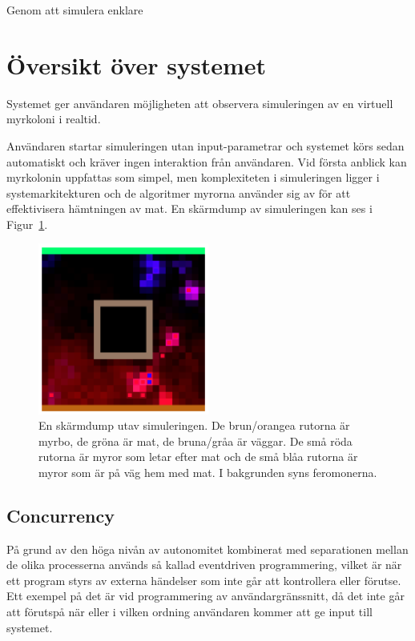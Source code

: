 \documentclass[12pt]{article}
\begin{document}
Genom att simulera enklare

\section{Översikt över systemet}
Systemet ger användaren möjligheten att observera simuleringen av en virtuell myrkoloni i realtid.

Användaren startar simuleringen utan input-parametrar och systemet körs sedan automatiskt och kräver ingen interaktion från användaren.
Vid första anblick kan myrkolonin uppfattas som simpel,
men komplexiteten i simuleringen ligger i systemarkitekturen och de algoritmer myrorna använder sig av för att effektivisera hämtningen av mat.
En skärmdump av simuleringen kan ses i Figur~\ref{fig:screen-dump}.

\begin{figure}
    \centering
    \includegraphics[width=0.5\textwidth]{BugsLife-Fig1.png}
    \caption{
        En skärmdump utav simuleringen.
        De brun/orangea rutorna är myrbo,
        de gröna är mat,
        de bruna/gråa är väggar.
        De små röda rutorna är myror som letar efter mat och de små blåa rutorna är myror som är på väg hem med mat.
        I bakgrunden syns feromonerna.
    }
    \label{fig:screen-dump}
\end{figure}

\subsection{Concurrency}
På grund av den höga nivån av autonomitet kombinerat med separationen mellan de olika processerna används så kallad eventdriven programmering,
vilket är när ett program styrs av externa händelser som inte går att kontrollera eller förutse.
Ett exempel på det är vid programmering av användargränssnitt,
då det inte går att förutspå när eller i vilken ordning användaren kommer att ge input till systemet.
\end{document}
